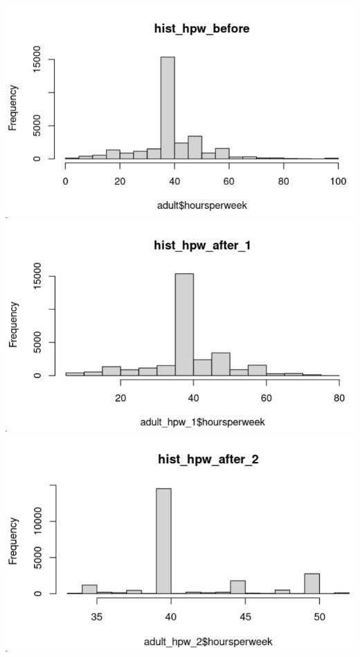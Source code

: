 \documentclass{article}
\begin{document}
    \begin{center}
    \includegraphics[scale = 0.22]{hist_hpw_before.png}
    \includegraphics[scale = 0.22]{hist_hpw_after_1.png}
    \includegraphics[scale = 0.22]{hist_hpw_after_2.png}
    \end{center}
\end{document}

